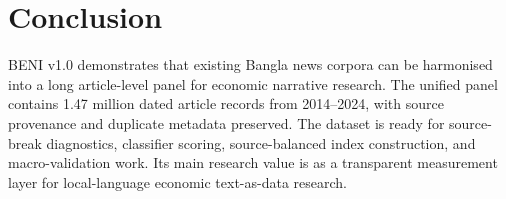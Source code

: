 \documentclass[11pt]{article}
\begin{document}
\section{Conclusion}

BENI v1.0 demonstrates that existing Bangla news corpora can be harmonised into a long article-level panel for economic narrative research. The unified panel contains 1.47 million dated article records from 2014--2024, with source provenance and duplicate metadata preserved. The dataset is ready for source-break diagnostics, classifier scoring, source-balanced index construction, and macro-validation work. Its main research value is as a transparent measurement layer for local-language economic text-as-data research.



\end{document}
